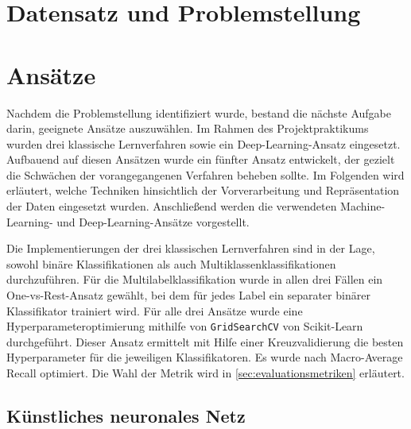 \documentclass[researchlab,palatino]{AIGpaper}
\begin{document}
\section{Datensatz und Problemstellung}
\label{Datensatz}


\section{Ansätze}
\label{sec:Ansaetze}
Nachdem die Problemstellung identifiziert wurde, bestand die nächste Aufgabe darin, geeignete Ansätze auszuwählen. Im Rahmen des Projektpraktikums wurden drei klassische Lernverfahren sowie ein Deep-Learning-Ansatz eingesetzt. Aufbauend auf diesen Ansätzen wurde ein fünfter Ansatz entwickelt, der gezielt die Schwächen der vorangegangenen Verfahren beheben sollte. Im Folgenden wird erläutert, welche Techniken hinsichtlich der Vorverarbeitung und Repräsentation der Daten eingesetzt wurden. Anschließend werden die verwendeten Machine-Learning- und Deep-Learning-Ansätze vorgestellt.

Die Implementierungen der drei klassischen Lernverfahren sind in der Lage, sowohl binäre Klassifikationen als auch Multiklassenklassifikationen durchzuführen. Für die Multilabelklassifikation wurde in allen drei Fällen ein One-vs-Rest-Ansatz gewählt, bei dem für jedes Label ein separater binärer Klassifikator trainiert wird. Für alle drei Ansätze wurde eine Hyperparameteroptimierung mithilfe von \texttt{GridSearchCV} von Scikit-Learn \cite{Pedregosa2011} durchgeführt. Dieser Ansatz ermittelt mit Hilfe einer Kreuzvalidierung die besten Hyperparameter für die jeweiligen Klassifikatoren. Es wurde nach Macro-Average Recall optimiert. Die Wahl der Metrik wird in \ref{sec:evaluationsmetriken} erläutert.









\subsection{Künstliches neuronales Netz}
\label{KNN}

\end{document}
